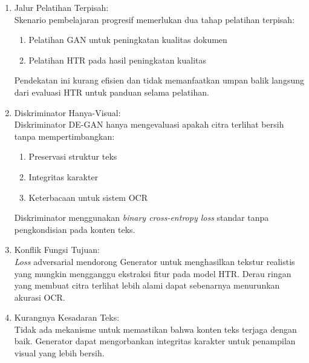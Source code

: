 \begin{enumerate}[leftmargin=*, labelindent=0pt, itemsep=1ex, topsep=0pt]
\begin{enumerate}[leftmargin=1.5em, labelsep=0.5em, itemindent=0pt, label=\alph*., topsep=0pt, parsep=0pt, itemsep=0pt]
      \item Jalur Pelatihan Terpisah: \mbox{}\\[0.1em]
            Skenario pembelajaran progresif memerlukan dua tahap pelatihan terpisah:
            \begin{enumerate}[leftmargin=1.5em, labelsep=0.5em, itemindent=0pt, label=\alph*., topsep=0pt, parsep=0pt, itemsep=0pt]
                  \item Pelatihan GAN untuk peningkatan kualitas dokumen
                  \item Pelatihan HTR pada hasil peningkatan kualitas
            \end{enumerate}
            Pendekatan ini kurang efisien dan tidak memanfaatkan umpan balik langsung dari evaluasi HTR untuk panduan selama pelatihan.

      \item Diskriminator Hanya-Visual: \mbox{}\\[0.1em]
            Diskriminator DE-GAN hanya mengevaluasi apakah citra terlihat bersih tanpa mempertimbangkan:

            \begin{enumerate}[leftmargin=1.5em, labelsep=0.5em, itemindent=0pt, label=\alph*., topsep=0pt, parsep=0pt, itemsep=0pt]
                  \item Preservasi struktur teks
                  \item Integritas karakter
                  \item Keterbacaan untuk sistem OCR
            \end{enumerate}
            Diskriminator menggunakan \textit{binary cross-entropy loss} standar tanpa pengkondisian pada konten teks.

      \item Konflik Fungsi Tujuan: \mbox{}\\[0.1em]
            \textit{Loss} adversarial mendorong Generator untuk menghasilkan tekstur realistis yang mungkin mengganggu ekstraksi fitur pada model HTR. Derau ringan yang membuat citra terlihat lebih alami dapat sebenarnya menurunkan akurasi OCR.

      \item Kurangnya Kesadaran Teks: \mbox{}\\[0.1em]
            Tidak ada mekanisme untuk memastikan bahwa konten teks terjaga dengan baik. Generator dapat mengorbankan integritas karakter untuk penampilan visual yang lebih bersih.
\end{enumerate}


\end{enumerate}
